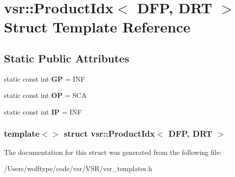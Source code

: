 \hypertarget{structvsr_1_1_product_idx_3_01_d_f_p_00_01_d_r_t_01_4}{\section{vsr\-:\-:Product\-Idx$<$ D\-F\-P, D\-R\-T $>$ Struct Template Reference}
\label{structvsr_1_1_product_idx_3_01_d_f_p_00_01_d_r_t_01_4}
}
\subsection*{Static Public Attributes}
\begin{DoxyCompactItemize}
\item 
\hypertarget{structvsr_1_1_product_idx_3_01_d_f_p_00_01_d_r_t_01_4_a426c8085b9a2eea5013a81d02ee2d8c4}{static const int {\bfseries G\-P} = I\-N\-F}\label{structvsr_1_1_product_idx_3_01_d_f_p_00_01_d_r_t_01_4_a426c8085b9a2eea5013a81d02ee2d8c4}

\item 
\hypertarget{structvsr_1_1_product_idx_3_01_d_f_p_00_01_d_r_t_01_4_a4a08042c5e23512d865d688b9d1823f6}{static const int {\bfseries O\-P} = S\-C\-A}\label{structvsr_1_1_product_idx_3_01_d_f_p_00_01_d_r_t_01_4_a4a08042c5e23512d865d688b9d1823f6}

\item 
\hypertarget{structvsr_1_1_product_idx_3_01_d_f_p_00_01_d_r_t_01_4_aa8fd90e99a8cbad8f410a3c18a15ba7d}{static const int {\bfseries I\-P} = I\-N\-F}\label{structvsr_1_1_product_idx_3_01_d_f_p_00_01_d_r_t_01_4_aa8fd90e99a8cbad8f410a3c18a15ba7d}

\end{DoxyCompactItemize}
\subsubsection*{template$<$$>$ struct vsr\-::\-Product\-Idx$<$ D\-F\-P, D\-R\-T $>$}



The documentation for this struct was generated from the following file\-:\begin{DoxyCompactItemize}
\item 
/\-Users/wolftype/code/vsr/\-V\-S\-R/vsr\-\_\-templates.\-h\end{DoxyCompactItemize}
